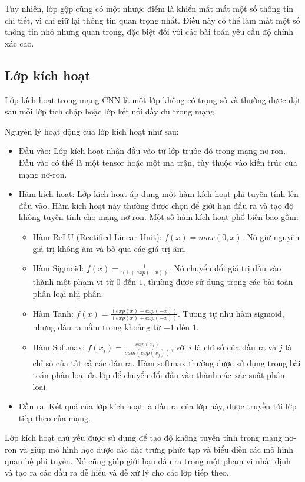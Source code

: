 Tuy nhiên, lớp gộp cũng có một nhược điểm là khiến mất mất một số thông tin chi tiết, vì chỉ giữ lại thông tin quan trọng nhất. Điều này có thể làm mất một số thông tin nhỏ nhưng quan trọng, đặc biệt đối với các bài toán yêu cầu độ chính xác cao.

\subsection{Lớp kích hoạt}
Lớp kích hoạt trong mạng CNN là một lớp không có trọng số và thường được đặt sau mỗi lớp tích chập hoặc lớp kết nối đầy đủ trong mạng.

Nguyên lý hoạt động của lớp kích hoạt như sau:

\begin{itemize}
    \item Đầu vào: Lớp kích hoạt nhận đầu vào từ lớp trước đó trong mạng nơ-ron. Đầu vào có thể là một tensor hoặc một ma trận, tùy thuộc vào kiến trúc của mạng nơ-ron.
    \item Hàm kích hoạt: Lớp kích hoạt áp dụng một hàm kích hoạt phi tuyến tính lên đầu vào. Hàm kích hoạt này thường được chọn để giới hạn đầu ra và tạo độ không tuyến tính cho mạng nơ-ron. Một số hàm kích hoạt phổ biến bao gồm:
    \begin{itemize}
        \item Hàm ReLU (Rectified Linear Unit): $f(x) = max(0, x)$. Nó giữ nguyên giá trị không âm và bỏ qua các giá trị âm.
        \item Hàm Sigmoid: $f(x) = \frac{1}{(1 + exp(-x))}$. Nó chuyển đổi giá trị đầu vào thành một phạm vi từ $0$ đến $1$, thường được sử dụng trong các bài toán phân loại nhị phân.
        \item Hàm Tanh: $f(x) = \frac{(exp(x) - exp(-x))}{(exp(x) + exp(-x))}$. Tương tự như hàm sigmoid, nhưng đầu ra nằm trong khoảng từ $-1$ đến $1$.
        \item Hàm Softmax: $f(x_i) = \frac{exp(x_i)}{sum(exp(x_j))}$, với $i$ là chỉ số của đầu ra và $j$ là chỉ số của tất cả các đầu ra. Hàm softmax thường được sử dụng trong bài toán phân loại đa lớp để chuyển đổi đầu vào thành các xác suất phân loại.
    
    \end{itemize}
    \item Đầu ra: Kết quả của lớp kích hoạt là đầu ra của lớp này, được truyền tới lớp tiếp theo của mạng.
\end{itemize}
    
Lớp kích hoạt chủ yếu được sử dụng để tạo độ không tuyến tính trong mạng nơ-ron và giúp mô hình học được các đặc trưng phức tạp và biểu diễn các mô hình quan hệ phi tuyến. Nó cũng giúp giới hạn đầu ra trong một phạm vi nhất định và tạo ra các đầu ra dễ hiểu và dễ xử lý cho các lớp tiếp theo.

